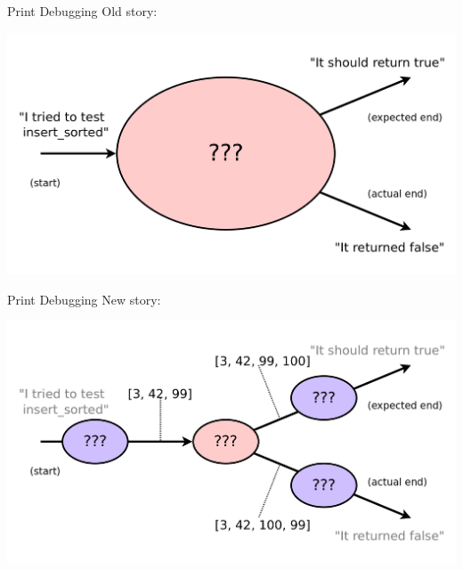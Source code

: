 \documentclass[xcolor=dvipsnames]{beamer}
\begin{document}
\begin{frame}{Print Debugging}
	Old story:

	\includegraphics[width=\textwidth]{time0.png}
\end{frame}
\begin{frame}{Print Debugging}
	New story:

	\includegraphics[width=\textwidth]{time1.png}
\end{frame}
\end{document}
